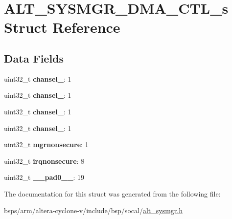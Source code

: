 \hypertarget{structALT__SYSMGR__DMA__CTL__s}{}\section{A\+L\+T\+\_\+\+S\+Y\+S\+M\+G\+R\+\_\+\+D\+M\+A\+\_\+\+C\+T\+L\+\_\+s Struct Reference}
\label{structALT__SYSMGR__DMA__CTL__s}
\subsection*{Data Fields}
\begin{DoxyCompactItemize}
\item 
\mbox{\label{structALT__SYSMGR__DMA__CTL__s_a9b4794e773cb428790e1608071fe7b51}} 
uint32\+\_\+t {\bfseries chansel\+\_}\+: 1
\item 
\mbox{\label{structALT__SYSMGR__DMA__CTL__s_adae000d92f3d976be0dd74a7c228fd37}} 
uint32\+\_\+t {\bfseries chansel\+\_}\+: 1
\item 
\mbox{\label{structALT__SYSMGR__DMA__CTL__s_ac1fff9841692fb5f685a457f5fca7a4c}} 
uint32\+\_\+t {\bfseries chansel\+\_}\+: 1
\item 
\mbox{\label{structALT__SYSMGR__DMA__CTL__s_afe6fe454ec23bee9f55fd04d9fca1d79}} 
uint32\+\_\+t {\bfseries chansel\+\_}\+: 1
\item 
\mbox{\label{structALT__SYSMGR__DMA__CTL__s_a2afb54230439aaec74453d5745e74e5f}} 
uint32\+\_\+t {\bfseries mgrnonsecure}\+: 1
\item 
\mbox{\label{structALT__SYSMGR__DMA__CTL__s_a915a9745e22767be649216529239750f}} 
uint32\+\_\+t {\bfseries irqnonsecure}\+: 8
\item 
\mbox{\label{structALT__SYSMGR__DMA__CTL__s_a29089a642f9d98ad38fee3c6cc320634}} 
uint32\+\_\+t {\bfseries \+\_\+\+\_\+pad0\+\_\+\+\_\+}\+: 19
\end{DoxyCompactItemize}


The documentation for this struct was generated from the following file\+:\begin{DoxyCompactItemize}
\item 
bsps/arm/altera-\/cyclone-\/v/include/bsp/socal/\mbox{\hyperlink{alt__sysmgr_8h}{alt\+\_\+sysmgr.\+h}}\end{DoxyCompactItemize}
